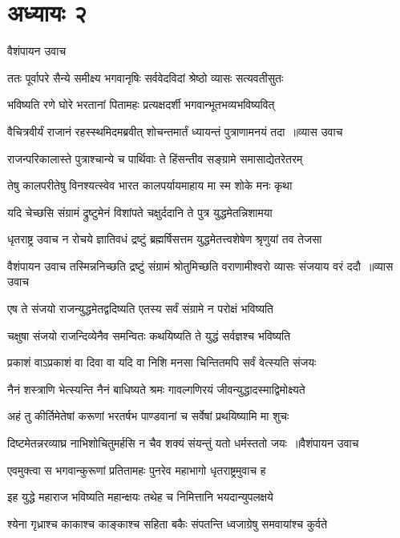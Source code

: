 \chapter{अध्यायः २}
\twolineshloka
{वैशंपायन उवाच}
{}


\twolineshloka
{ततः पूर्वापरे सैन्ये समीक्ष्य भगवानृषिः}
{सर्ववेदविदां श्रेष्ठो व्यासः सत्यवतीसुतः}


\twolineshloka
{भविष्यति रणे घोरे भरतानां पितामहः}
{प्रत्यक्षदर्शी भगवान्भूतभव्यभविष्यवित्}


\threelineshloka
{वैचित्रवीर्यं राजानं रहस्स्थमिदमब्रवीत्}
{शोचन्तमार्तं ध्यायन्तं पुत्राणामनयं तदा ॥व्यास उवाच}
{}


\twolineshloka
{राजन्परिकालास्ते पुत्राश्चान्ये च पार्थिवाः}
{ते हिंसन्तीव सङ्ग्रामे समासाद्येतरेतरम्}


\twolineshloka
{तेषु कालपरीतेषु विनश्यत्स्वेव भारत}
{कालपर्यायमाहाय मा स्म शोके मनः कृथा}


\twolineshloka
{यदि चेच्छसि संग्रामं द्रुष्टुमेनं विशांपते}
{चक्षुर्ददानि ते पुत्र युद्धमेतन्निशामया}


\threelineshloka
{धृतराष्ट्र उवाच}
{न रोचये ज्ञातिवधं द्रष्टुं ब्रह्मर्षिसत्तम}
{युद्धमेतत्त्वशेषेण श्रृणुयां तव तेजसा}


\fourlineindentedshloka
{वैशंपायन उवाच}
{तस्मिन्ननिच्छति द्रष्टुं संग्रामं श्रोतुमिच्छति}
{वराणामीश्वरो व्यासः संजयाय वरं ददौ ॥व्यास उवाच}
{}


\twolineshloka
{एष ते संजयो राजन्युद्धमेतद्वदिष्यति}
{एतस्य सर्वं संग्रामे न परोक्षं भविष्यति}


\twolineshloka
{चक्षुषा संजयो राजन्दिव्येनैव समन्वितः}
{कथयिष्यति ते युद्धं सर्वज्ञश्च भविष्यति}


\twolineshloka
{प्रकाशं वाऽप्रकाशं वा दिवा वा यदि वा निशि}
{मनसा चिन्तितमपि सर्वं वेत्स्यति संजयः}


\twolineshloka
{नैनं शस्त्राणि भेत्स्यन्ति नैनं बाधिष्यते श्रमः}
{गावल्गणिरयं जीवन्युद्धादस्माद्विमोक्ष्यते}


\twolineshloka
{अहं तु कीर्तिमेतेषां करूणां भरतर्षभ}
{पाण्डवानां च सर्वेषां प्रथयिष्यामि मा शुचः}


\threelineshloka
{दिष्टमेतन्नरव्याघ्र नाभिशोचितुमर्हसि}
{न चैव शक्यं संयन्तुं यतो धर्मस्ततो जयः ॥वैशंपायन उवाच}
{}


\twolineshloka
{एवमुक्त्वा स भगवान्कुरूणां प्रतितामहः}
{पुनरेव महाभागो धृतराष्ट्रमुवाच ह}


\twolineshloka
{इह युद्धे महाराज भविष्यति महान्क्षयः}
{तथेह च निमित्तानि भयदान्युपलक्षये}


\twolineshloka
{श्येना गृध्राश्च काकाश्च काङ्काश्च सहिता बकैः}
{संपतन्ति ध्वजाग्रेषु समवायांश्च कुर्वते}


